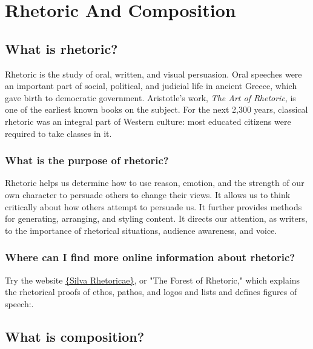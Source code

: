 
\chapter{Rhetoric And Composition}


\section{What is rhetoric?}

Rhetoric is the study of oral, written, and visual persuasion. Oral speeches were an 
important part of social, political, and judicial life in ancient Greece, which gave birth 
to democratic government. Aristotle's work, \emph{The Art of Rhetoric}, is one of the 
earliest known books on the subject. For the next 2,300 years, classical rhetoric was an 
integral part of Western culture: most educated citizens were required to take classes 
in it.

\subsection{What is the purpose of rhetoric?}

Rhetoric helps us determine how to use reason, emotion, and the strength of our own 
character to persuade others to change their views. It allows us to think critically about 
how others attempt to persuade us. It further provides methods for generating, 
arranging, and styling content. It directs our attention, as writers, to the importance 
of rhetorical situations, audience awareness, and voice.

\subsection{Where can I find more online information about rhetoric?}

Try the website \href{http://rhetoric.byu.edu} {\{Silva Rhetoricae\}}, or "The Forest of 
Rhetoric," which explains the rhetorical proofs of ethos, pathos, and logos and lists and 
defines figures of speech:.


\section{What is composition?}

